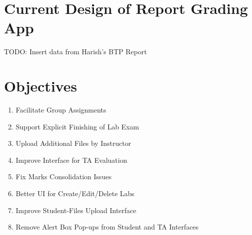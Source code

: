 \section{Current Design of Report Grading App}
TODO: Insert data from Harish's BTP Report

\section{Objectives}
\begin{enumerate}
\item Facilitate Group Assignments
\item Support Explicit Finishing of Lab Exam
\item Upload Additional Files by Instructor
\item Improve Interface for TA Evaluation
\item Fix Marks Consolidation Issues
\item Better UI for Create/Edit/Delete Labs
\item Improve Student-Files Upload Interface
\item Remove Alert Box Pop-ups from Student and TA Interfaces
\end{enumerate}

